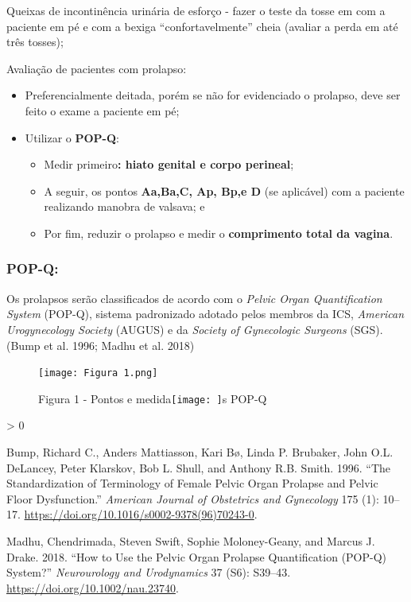 \documentclass[
]{article}
\newlength{\cslhangindent}
\newenvironment{CSLReferences}[2] %
 {%
  \setlength{\parindent}{0pt}
  \ifodd #1 \everypar{\setlength{\hangindent}{\cslhangindent}}\ignorespaces\fi
  \ifnum #2 > 0
  \setlength{\parskip}{#2\baselineskip}
  \fi
 }%
 {}
\begin{document}
Queixas de incontinência urinária de esforço - fazer o teste da tosse em
com a paciente em pé e com a bexiga ``confortavelmente'' cheia (avaliar
a perda em até três tosses);

Avaliação de pacientes com prolapso:

\begin{itemize}
\item
  Preferencialmente deitada, porém se não for evidenciado o prolapso,
  deve ser feito o exame a paciente em pé;
\item
  Utilizar o \textbf{POP-Q}:

  \begin{itemize}
  \item
    Medir primeiro\textbf{: hiato genital e corpo perineal};
  \item
    A seguir, os pontos \textbf{Aa,Ba,C, Ap, Bp,e D} (se aplicável) com
    a paciente realizando manobra de valsava; e
  \item
    Por fim, reduzir o prolapso e medir o \textbf{comprimento total da
    vagina}.
  \end{itemize}
\end{itemize}

\hypertarget{pop-q}{%
\subsubsection{POP-Q:}\label{pop-q}}

Os prolapsos serão classificados de acordo com o \emph{Pelvic Organ
Quantification System} (POP-Q), sistema padronizado adotado pelos
membros da ICS, \emph{American Urogynecology Society} (AUGUS) e da
\emph{Society of Gynecologic Surgeons} (SGS).(Bump et al. 1996; Madhu et
al. 2018)

\begin{figure}
\centering
\texttt{[image: Figura 1.png]}
\caption{Figura 1 - Pontos e medida\texttt{[image: ]}s POP-Q}
\end{figure}

\hypertarget{refs}{}
\begin{CSLReferences}{1}{0}
\leavevmode\hypertarget{ref-Bump1996}{}%
Bump, Richard C., Anders Mattiasson, Kari Bø, Linda P. Brubaker, John
O.L. DeLancey, Peter Klarskov, Bob L. Shull, and Anthony R.B. Smith.
1996. {``The Standardization of Terminology of Female Pelvic Organ
Prolapse and Pelvic Floor Dysfunction.''} \emph{American Journal of
Obstetrics and Gynecology} 175 (1): 10--17.
\url{https://doi.org/10.1016/s0002-9378(96)70243-0}.

\leavevmode\hypertarget{ref-Madhu2018}{}%
Madhu, Chendrimada, Steven Swift, Sophie Moloney-Geany, and Marcus J.
Drake. 2018. {``How to Use the Pelvic Organ Prolapse Quantification
(POP-Q) System?''} \emph{Neurourology and Urodynamics} 37 (S6): S39--43.
\url{https://doi.org/10.1002/nau.23740}.

\end{CSLReferences}
\end{document}
